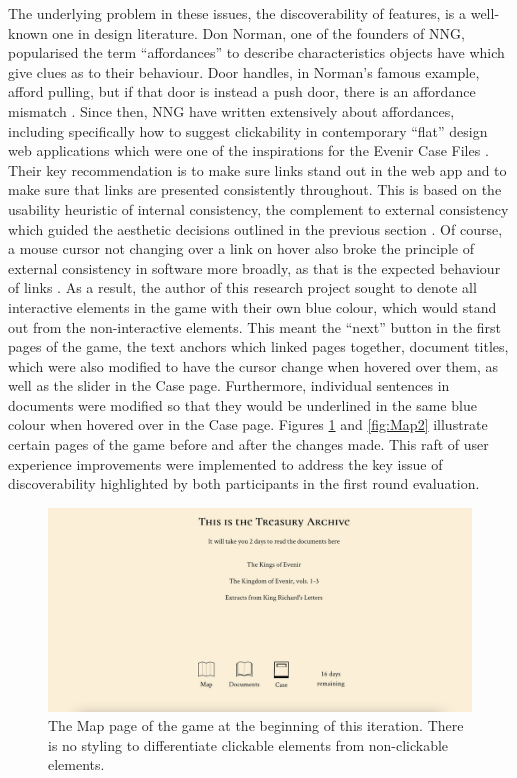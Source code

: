 \documentclass{l4proj}
\begin{document}
The underlying problem in these issues, the discoverability of features, is a well-known one in design literature. Don Norman, one of the founders of NNG, popularised the term “affordances” to describe characteristics objects have which give clues as to their behaviour. Door handles, in Norman’s famous example, afford pulling, but if that door is instead a push door, there is an affordance mismatch \citep{norman1988psychology}. Since then, NNG have written extensively about affordances, including specifically how to suggest clickability in contemporary “flat” design web applications which were one of the inspirations for the Evenir Case Files \citep{nng2015links}. Their key recommendation is to make sure links stand out in the web app and to make sure that links are presented consistently throughout. This is based on the usability heuristic of internal consistency, the complement to external consistency which guided the aesthetic decisions outlined in the previous section \citep{nng2021consistency}. Of course, a mouse cursor not changing over a link on hover also broke the principle of external consistency in software more broadly, as that is the expected behaviour of links \citep{nng2021consistency}. As a result, the author of this research project sought to denote all interactive elements in the game with their own blue colour, which would stand out from the non-interactive elements. This meant the “next” button in the first pages of the game, the text anchors which linked pages together, document titles, which were also modified to have the cursor change when hovered over them, as well as the slider in the Case page. Furthermore, individual sentences in documents were modified so that they would be underlined in the same blue colour when hovered over in the Case page. Figures \ref{fig:Map1} and \ref{fig:Map2} illustrate certain pages of the game before and after the changes made. This raft of user experience improvements were implemented to address the key issue of discoverability highlighted by both participants in the first round evaluation.

\begin{figure}[htb]
    \centering
    \includegraphics[scale=0.55]{images/Map_1.png}
    \caption{The Map page of the game at the beginning of this iteration. There is no styling to differentiate clickable elements from non-clickable elements.}
    \label{fig:Map1}
\end{figure}
\end{document}
